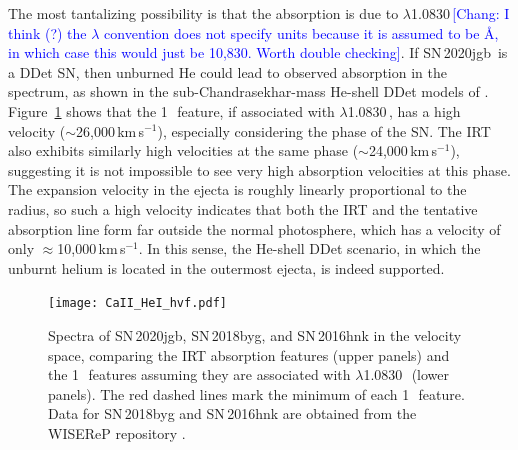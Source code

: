 \documentclass[twocolumn]{aastex631}
\newcommand{\sn}{SN\,2020jgb}
\newcommand{\chang}[1]{\textcolor{blue}{[Chang: #1]}}
\begin{document}
The most tantalizing possibility is that the absorption is due to  $\lambda$1.0830\,\micron \chang{I think (?) the $\lambda$ convention does not specify units because it is assumed to be \AA, in which case this would just be 10,830. Worth double checking}. If \sn\ is a DDet SN, then unburned He could lead to observed absorption in the spectrum, as shown in the sub-Chandrasekhar-mass He-shell DDet models of \citet{Boyle2017_Helium}. Figure~\ref{fig:hvf_comp} shows that the 1\,\micron\ feature, if associated with  $\lambda$1.0830\,\micron, has a high velocity ($\sim$26,000\,km\,s$^{-1}$), especially considering the phase of the SN. The  IRT also exhibits similarly high velocities at the same phase ($\sim$24,000\,km\,s$^{-1}$), suggesting it is not impossible to see very high absorption velocities at this phase. The expansion velocity in the ejecta is roughly linearly proportional to the radius, so such a high velocity indicates that both the  IRT and the tentative  absorption line form far outside the normal photosphere, which has a velocity of only $\approx$10,000\,km\,s$^{-1}$. In this sense, the He-shell DDet scenario, in which the unburnt helium is located in the outermost ejecta, is indeed supported.
\begin{figure}
    \centering
    \texttt{[image: CaII\_HeI\_hvf.pdf]}
    \caption{Spectra of \sn, SN\,2018byg, and SN\,2016hnk in the velocity space, comparing the  IRT absorption features (upper panels) and the 1\,\micron\ features assuming they are associated with  $\lambda$1.0830\,\micron\ (lower panels). The red dashed lines mark the minimum of each 1\,\micron\ feature. Data for SN\,2018byg and SN\,2016hnk are obtained from the WISEReP repository \citep{wiserep_2012}.}
    \label{fig:hvf_comp}
\end{figure}
\end{document}
